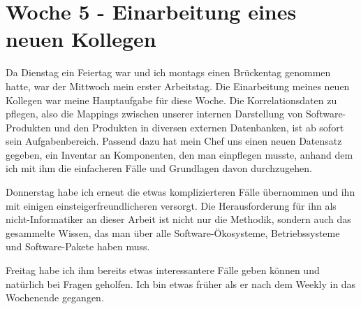 \section{Woche 5 - Einarbeitung eines neuen Kollegen} \label{sec:bericht-wo-5}


\lweekdaymarginpar{\weekdayWednesdayLong}

Da Dienstag ein Feiertag war und ich montags einen Brückentag genommen hatte, war der Mittwoch mein erster Arbeitstag.
Die Einarbeitung meines neuen Kollegen war meine Hauptaufgabe für diese Woche.
Die Korrelationsdaten zu pflegen, also die Mappings zwischen unserer internen Darstellung von Software-Produkten und den Produkten in diversen externen Datenbanken, ist ab sofort sein Aufgabenbereich.
Passend dazu hat mein Chef uns einen neuen Datensatz gegeben, ein Inventar an Komponenten, den man einpflegen musste, anhand dem ich mit ihm die einfacheren Fälle und Grundlagen davon durchzugehen.

\sweekdaymarginpar{\weekdayThursdayLong}

Donnerstag habe ich erneut die etwas komplizierteren Fälle übernommen und ihn mit einigen einsteigerfreundlicheren versorgt.
Die Herausforderung für ihn als nicht-Informatiker an dieser Arbeit ist nicht nur die Methodik, sondern auch das gesammelte Wissen, das man über alle Software-Ökosysteme, Betriebssysteme und Software-Pakete haben muss.

\sweekdaymarginpar{\weekdayFridayLong}

Freitag habe ich ihm bereits etwas interessantere Fälle geben können und natürlich bei Fragen geholfen.
Ich bin etwas früher als er nach dem Weekly in das Wochenende gegangen.
